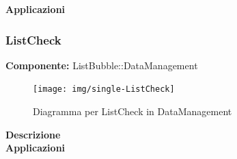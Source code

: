 \textbf{Applicazioni}\\
 


\clearpage

\subsubsection{ListCheck}
\textbf{Componente:}  ListBubble::DataManagement\\
   \FloatBarrier
   \begin{figure}[ht]
   \centering
   \texttt{[image: img/single-ListCheck]}
   \caption{{Diagramma per ListCheck in DataManagement}}
\end{figure}
\FloatBarrier
\textbf{Descrizione}\\
 


\textbf{Applicazioni}\\
 


\clearpage

